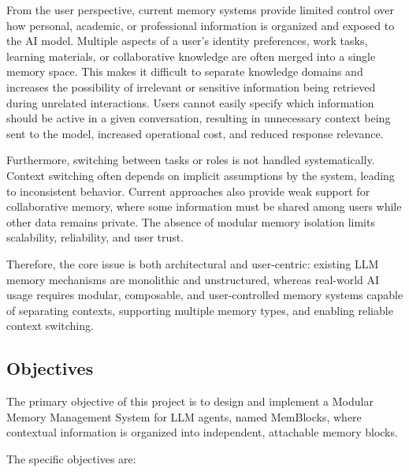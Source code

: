 ﻿\documentclass[12pt,a4paper]{article}
\begin{document}
From the user perspective, current memory systems provide limited control over how personal, academic, or professional information is organized and exposed to the AI model. Multiple aspects of a user's identity  preferences, work tasks, learning materials, or collaborative knowledge  are often merged into a single memory space. This makes it difficult to separate knowledge domains and increases the possibility of irrelevant or sensitive information being retrieved during unrelated interactions. Users cannot easily specify which information should be active in a given conversation, resulting in unnecessary context being sent to the model, increased operational cost, and reduced response relevance.

Furthermore, switching between tasks or roles is not handled systematically. Context switching often depends on implicit assumptions by the system, leading to inconsistent behavior. Current approaches also provide weak support for collaborative memory, where some information must be shared among users while other data remains private. The absence of modular memory isolation limits scalability, reliability, and user trust.

Therefore, the core issue is both architectural and user-centric: existing LLM memory mechanisms are monolithic and unstructured, whereas real-world AI usage requires modular, composable, and user-controlled memory systems capable of separating contexts, supporting multiple memory types, and enabling reliable context switching.

\subsection{Objectives}

The primary objective of this project is to design and implement a Modular Memory Management System for LLM agents, named MemBlocks, where contextual information is organized into independent, attachable memory blocks.

The specific objectives are:
\end{document}
